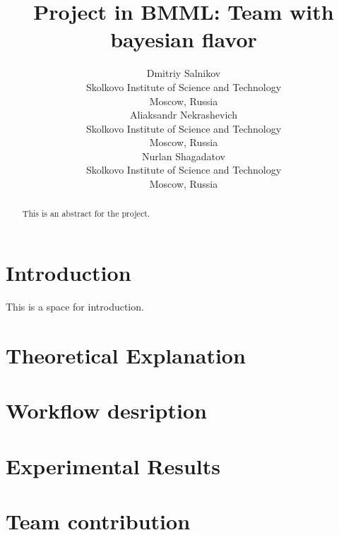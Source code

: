 \documentclass{article}
\title{Project in BMML: Team with bayesian flavor}
\author{
   \And
  Dmitriy Salnikov   \\
  Skolkovo Institute of Science and Technology \\
  Moscow, Russia \\
   \And
  Aliaksandr Nekrashevich \\
  Skolkovo Institute of Science and Technology \\
  Moscow, Russia \\
   \And
  Nurlan Shagadatov\\
  Skolkovo Institute of Science and Technology \\
  Moscow, Russia \\
}
\begin{document}
\maketitle

\begin{abstract}
    This is an abstract for the project.
\end{abstract}




\section{Introduction}
This is a space for introduction.

\section{Theoretical Explanation}

\section{Workflow desription}

\section{Experimental Results}

\section{Team contribution}




\end{document}
